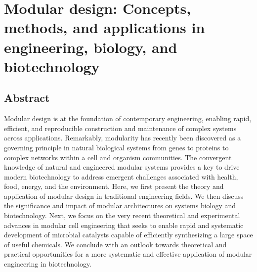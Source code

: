 \chapter{Modular design: Concepts, methods, and applications in engineering, biology, and biotechnology}\label{ch:classroom}




%
%

\section*{Abstract}

Modular design is at the foundation of contemporary engineering, enabling rapid, efficient, and reproducible construction and maintenance of complex systems across applications.
Remarkably, modularity has recently been discovered as a governing principle in natural biological systems from genes to proteins to complex networks within a cell and organism communities.
The convergent knowledge of natural and engineered modular systems provides a key to drive modern biotechnology to address emergent challenges associated with health, food, energy, and the environment.
Here, we first present the theory and application of modular design in traditional engineering fields.
We then discuss the significance and impact of modular architectures on systems biology and biotechnology.
Next, we focus on the very recent theoretical and experimental advances in modular cell engineering that seeks to enable rapid and systematic development of microbial catalysts capable of efficiently synthesizing a large space of useful chemicals.
We conclude with an outlook towards theoretical and practical opportunities for a more systematic and effective application of modular engineering in biotechnology.

